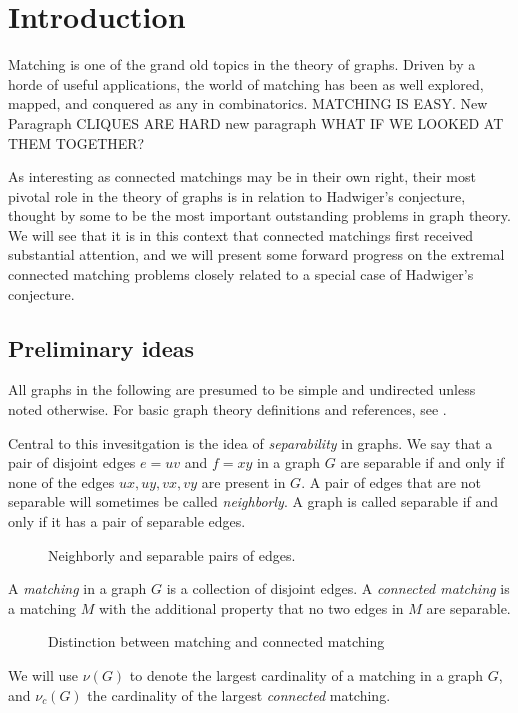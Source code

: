 \chapter{Introduction}

Matching is one of the grand old topics in the theory of graphs.  Driven by a horde of useful applications, the world of matching has been as well explored, mapped, and conquered as any in combinatorics.  MATCHING IS EASY. New Paragraph CLIQUES ARE HARD new paragraph WHAT IF WE LOOKED AT THEM TOGETHER? 

As interesting as connected matchings may be in their own right, their most pivotal role in the theory of graphs is in relation to Hadwiger's conjecture, thought by some to be the most important outstanding problems in graph theory.  We will see that it is in this context that connected matchings first received substantial attention, and we will present some forward progress on the extremal connected matching problems closely related to a special case of Hadwiger's conjecture. 

\section{Preliminary ideas}
All graphs in the following are presumed to be simple and undirected unless noted otherwise.  For basic graph theory definitions and references, see \cite{West}.  

Central to this invesitgation is the idea of {\it separability} in graphs.  We say that a pair of disjoint edges $e = uv$ and $f = xy$ in a graph $G$ are separable if and only if none of the edges $ux, uy, vx, vy$ are present in $G$.  A pair of edges that are not separable will sometimes be called {\it neighborly}.  A graph is called separable if and only if it has a pair of separable edges.  

	\begin{figure}
	\begin{center}
		\hspace{2cm}
		\hspace{2cm}
		
		\label{separable}
		\caption{Neighborly and separable pairs of edges.}
	\end{center}
	\end{figure}


A {\it matching} in a graph $G$ is a collection of disjoint edges.  A {\it connected matching} is a matching $M$ with the additional property that no two edges in $M$ are separable.  
\begin{figure}
\begin{center}
\hspace{0.5cm}

\label{CMex}
\caption{Distinction between matching and connected matching}
\end{center}
\end{figure}
We will use $\nu(G)$ to denote the largest cardinality of a matching in a graph $G$, and $\nu_c(G)$ the cardinality of the largest {\it connected} matching.

